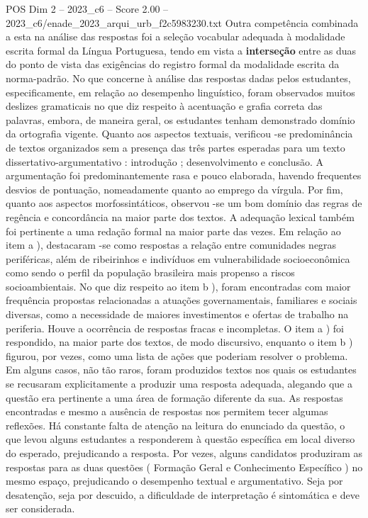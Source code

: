 \begin{textsample}{POS Dim 2 – 2023\_c6 – Score 2.00 – 2023\_c6/enade\_2023\_arqui\_urb\_f2c5983230.txt}
Outra competência combinada a esta na análise das respostas foi a seleção vocabular adequada à modalidade escrita formal da Língua Portuguesa, tendo em vista a \textbf{interseção} entre as duas do ponto de vista das exigências do registro formal da modalidade escrita da norma-padrão.
No que concerne à análise das respostas dadas pelos estudantes, especificamente, em relação ao desempenho linguístico, foram observados muitos deslizes gramaticais no que diz respeito à acentuação e grafia correta das palavras, embora, de maneira geral, os estudantes tenham demonstrado domínio da ortografia vigente.
Quanto aos aspectos textuais, verificou -se predominância de textos organizados sem a presença das três partes esperadas para um texto dissertativo-argumentativo : introdução ; desenvolvimento e conclusão.
A argumentação foi predominantemente rasa e pouco elaborada, havendo frequentes desvios de pontuação, nomeadamente quanto ao emprego da vírgula.
Por fim, quanto aos aspectos morfossintáticos, observou -se um bom domínio das regras de regência e concordância na maior parte dos textos.
A adequação lexical também foi pertinente a uma redação formal na maior parte das vezes.
Em relação ao item a ), destacaram -se como respostas a relação entre comunidades negras periféricas, além de ribeirinhos e indivíduos em vulnerabilidade socioeconômica como sendo o perfil da população brasileira mais propenso a riscos socioambientais.
No que diz respeito ao item b ), foram encontradas com maior frequência propostas relacionadas a atuações governamentais, familiares e sociais diversas, como a necessidade de maiores investimentos e ofertas de trabalho na periferia.
Houve a ocorrência de respostas fracas e incompletas.
O item a ) foi respondido, na maior parte dos textos, de modo discursivo, enquanto o item b ) figurou, por vezes, como uma lista de ações que poderiam resolver o problema.
Em alguns casos, não tão raros, foram produzidos textos nos quais os estudantes se recusaram explicitamente a produzir uma resposta adequada, alegando que a questão era pertinente a uma área de formação diferente da sua.
As respostas encontradas e mesmo a ausência de respostas nos permitem tecer algumas reflexões.
Há constante falta de atenção na leitura do enunciado da questão, o que levou alguns estudantes a responderem à questão específica em local diverso do esperado, prejudicando a resposta.
Por vezes, alguns candidatos produziram as respostas para as duas questões ( Formação Geral e Conhecimento Específico ) no mesmo espaço, prejudicando o desempenho textual e argumentativo.
Seja por desatenção, seja por descuido, a dificuldade de interpretação é sintomática e deve ser considerada.

\end{textsample}
